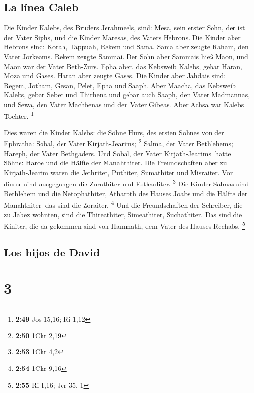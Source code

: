 \hypertarget{la-luxednea-caleb-1}{%
\subsection{La línea Caleb}\label{la-luxednea-caleb-1}}

 Die Kinder Kalebs, des Bruders Jerahmeels, sind: Mesa,
sein erster Sohn, der ist der Vater Siphs, und die Kinder Maresas, des
Vaters Hebrons.  Die Kinder aber Hebrons sind: Korah,
Tappuah, Rekem und Sama.  Sama aber zeugte Raham, den
Vater Jorkeams. Rekem zeugte Sammai.  Der Sohn aber
Sammais hieß Maon, und Maon war der Vater Beth-Zurs. 
Epha aber, das Kebsweib Kalebs, gebar Haran, Moza und Gases. Haran aber
zeugte Gases.  Die Kinder aber Jahdais sind: Regem,
Jotham, Gesan, Pelet, Epha und Saaph.  Aber Maacha, das
Kebsweib Kalebs, gebar Seber und Thirhena  und gebar auch
Saaph, den Vater Madmannas, und Sewa, den Vater Machbenas und den Vater
Gibeas. Aber Achsa war Kalebs Tochter. \footnote{\textbf{2:49} Jos
  15,16; Ri 1,12}

 Dies waren die Kinder Kalebs: die Söhne Hurs, des ersten
Sohnes von der Ephratha: Sobal, der Vater Kirjath-Jearims; \footnote{\textbf{2:50}
  1Chr 2,19}  Salma, der Vater Bethlehems; Hareph, der
Vater Bethgaders.  Und Sobal, der Vater Kirjath-Jearims,
hatte Söhne: Haroe und die Hälfte der Manahthiter.  Die
Freundschaften aber zu Kirjath-Jearim waren die Jethriter, Puthiter,
Sumathiter und Misraiter. Von diesen sind ausgegangen die Zorathiter und
Esthaoliter. \footnote{\textbf{2:53} 1Chr 4,2}  Die
Kinder Salmas sind Bethlehem und die Netophathiter, Atharoth des Hauses
Joabs und die Hälfte der Manahthiter, das sind die Zoraiter. \footnote{\textbf{2:54}
  1Chr 9,16}  Und die Freundschaften der Schreiber, die
zu Jabez wohnten, sind die Thireathiter, Simeathiter, Suchathiter. Das
sind die Kiniter, die da gekommen sind von Hammath, dem Vater des Hauses
Rechabs. \footnote{\textbf{2:55} Ri 1,16; Jer 35,-1}

\hypertarget{los-hijos-de-david}{%
\subsection{Los hijos de David}\label{los-hijos-de-david}}

\hypertarget{section-2}{%
\section{3}\label{section-2}}

